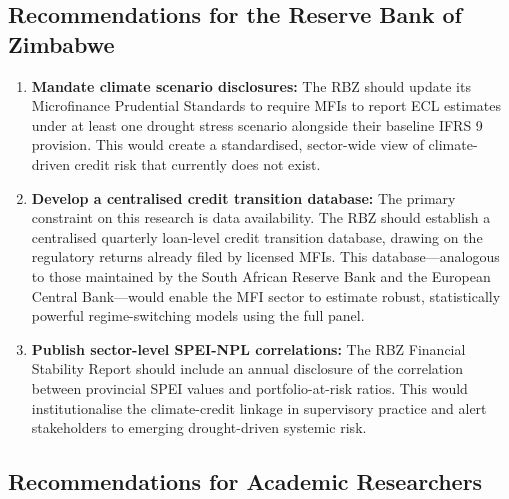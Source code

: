 \documentclass[12pt,a4paper]{article}
\begin{document}
\subsection{Recommendations for the Reserve Bank of Zimbabwe}

\begin{enumerate}[noitemsep]
    \item \textbf{Mandate climate scenario disclosures:} The RBZ should update its Microfinance Prudential Standards to require MFIs to report ECL estimates under at least one drought stress scenario alongside their baseline IFRS 9 provision. This would create a standardised, sector-wide view of climate-driven credit risk that currently does not exist.

    \item \textbf{Develop a centralised credit transition database:} The primary constraint on this research is data availability. The RBZ should establish a centralised quarterly loan-level credit transition database, drawing on the regulatory returns already filed by licensed MFIs. This database---analogous to those maintained by the South African Reserve Bank and the European Central Bank---would enable the MFI sector to estimate robust, statistically powerful regime-switching models using the full panel.

    \item \textbf{Publish sector-level SPEI-NPL correlations:} The RBZ Financial Stability Report should include an annual disclosure of the correlation between provincial SPEI values and portfolio-at-risk ratios. This would institutionalise the climate-credit linkage in supervisory practice and alert stakeholders to emerging drought-driven systemic risk.
\end{enumerate}

\subsection{Recommendations for Academic Researchers}
\end{document}
